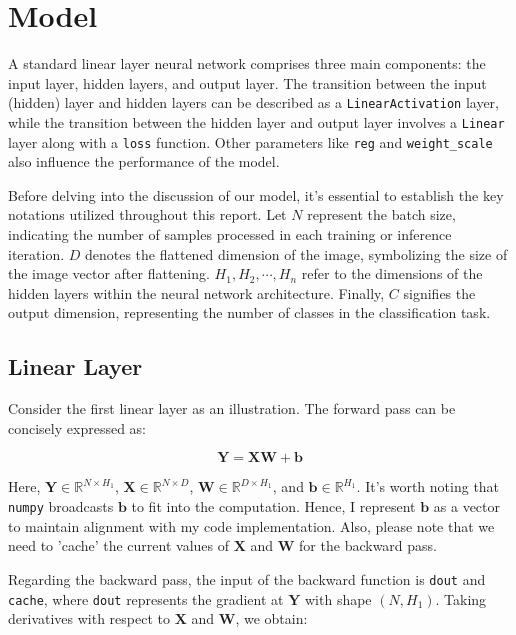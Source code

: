 \documentclass[10pt,a4paper,twoside]{tau}
\renewcommand{\vec}[1]{\mathbf{#1}}
\begin{document}
\section{Model}

A standard linear layer neural network comprises three main components: the input layer, hidden layers, and output layer. The transition between the input (hidden) layer and hidden layers can be described as a \texttt{LinearActivation} layer, while the transition between the hidden layer and output layer involves a \texttt{Linear} layer along with a \texttt{loss} function. Other parameters like \texttt{reg} and \texttt{weight\_scale} also influence the performance of the model.

Before delving into the discussion of our model, it's essential to establish the key notations utilized throughout this report. Let $N$ represent the batch size, indicating the number of samples processed in each training or inference iteration. $D$ denotes the flattened dimension of the image, symbolizing the size of the image vector after flattening. $H_1, H_2, \cdots, H_n$ refer to the dimensions of the hidden layers within the neural network architecture. Finally, $C$ signifies the output dimension, representing the number of classes in the classification task.

\subsection{Linear Layer}

Consider the first linear layer as an illustration. The forward pass can be concisely expressed as:

\begin{equation}
    \vec{Y} = \vec{X}\vec{W} + \vec{b} \tag{3.1.1}
\end{equation}

Here, $\vec{Y} \in \mathbb{R}^{N \times H_1}$, $\vec{X} \in \mathbb{R}^{N \times D}$, $\vec{W} \in \mathbb{R}^{D \times H_1}$, and $\vec{b} \in \mathbb{R}^{H_1}$. It's worth noting that \texttt{numpy} broadcasts $\vec{b}$ to fit into the computation. Hence, I represent $\vec{b}$ as a vector to maintain alignment with my code implementation. Also, please note that we need to 'cache' the current values of $\vec{X}$ and $\vec{W}$ for the backward pass.

Regarding the backward pass, the input of the backward function is \texttt{dout} and \texttt{cache}, where \texttt{dout} represents the gradient at $\vec{Y}$ with shape $(N, H_1)$. Taking derivatives with respect to $\vec{X}$ and $\vec{W}$, we obtain:
\end{document}
